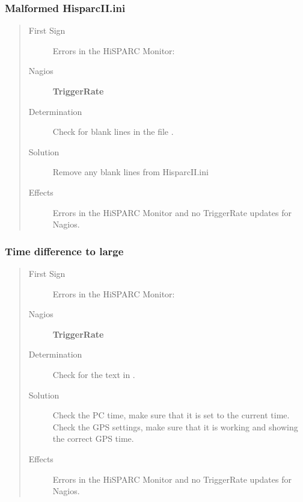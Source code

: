 \documentclass[a4paper,11pt,english]{sphinxmanual}
\begin{document}
\subsubsection{Malformed HisparcII.ini}
\label{known-issues:malformed-hisparcii-ini}\begin{quote}\begin{description}
\item[{First Sign}] \leavevmode
Errors in the HiSPARC Monitor: 

\item[{Nagios}] \leavevmode
\textbf{TriggerRate}

\item[{Determination}] \leavevmode
Check for blank lines in the file
.

\item[{Solution}] \leavevmode
Remove any blank lines from HisparcII.ini

\item[{Effects}] \leavevmode
Errors in the HiSPARC Monitor and no TriggerRate updates for
Nagios.

\end{description}\end{quote}


\subsubsection{Time difference to large}
\label{known-issues:time-difference-to-large}\begin{quote}\begin{description}
\item[{First Sign}] \leavevmode
Errors in the HiSPARC Monitor: 

\item[{Nagios}] \leavevmode
\textbf{TriggerRate}

\item[{Determination}] \leavevmode
Check for the text  in
.

\item[{Solution}] \leavevmode
Check the PC time, make sure that it is set to the current
time. Check the GPS settings, make sure that it is working
and showing the correct GPS time.

\item[{Effects}] \leavevmode
Errors in the HiSPARC Monitor and no TriggerRate updates for
Nagios.

\end{description}\end{quote}
\end{document}
